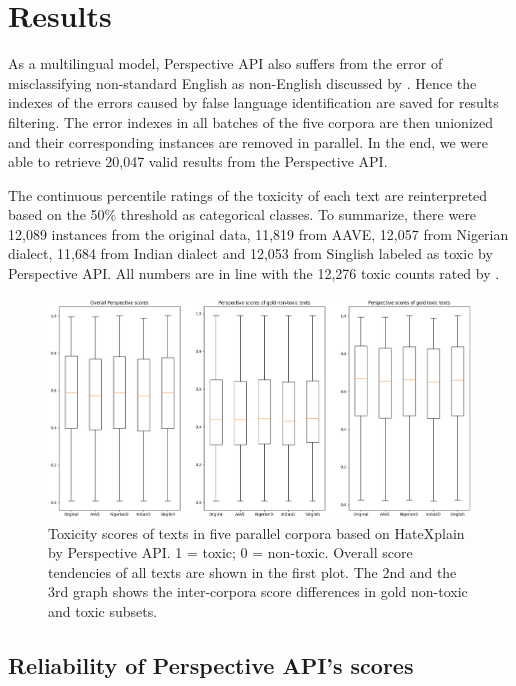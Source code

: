 \documentclass[11pt]{article}
\begin{document}
\section{Results}

As a multilingual model, Perspective API also suffers from the error of misclassifying non-standard English as non-English discussed by \citet{davidson-etal-2019-racial}. Hence the indexes of the errors caused by false language identification are saved for results filtering. The error indexes in all batches of the five corpora are then unionized and their corresponding instances are removed in parallel. In the end, we were able to retrieve 20,047 valid results from the Perspective API.

The continuous percentile ratings of the toxicity of each text are reinterpreted based on the 50\% threshold as categorical classes. To summarize, there were 12,089 instances from the original data, 11,819 from AAVE, 12,057 from Nigerian dialect, 11,684 from Indian dialect and 12,053 from Singlish labeled as toxic by Perspective API. All numbers are in line with the 12,276 toxic counts rated by \citet{mathew-2021-hatexplain}.

\begin{figure}[t]
  \includegraphics[width=1.0\linewidth]{figs-misc/all-scores.png}
  \caption{Toxicity scores of texts in five parallel corpora based on HateXplain by Perspective API. 1 = toxic; 0 = non-toxic. Overall score tendencies of all texts are shown in the first plot. The 2nd and the 3rd graph shows the inter-corpora score differences in gold non-toxic and toxic subsets.}
  \label{all-scores}
\end{figure}

\subsection{Reliability of Perspective API's scores}
\end{document}
